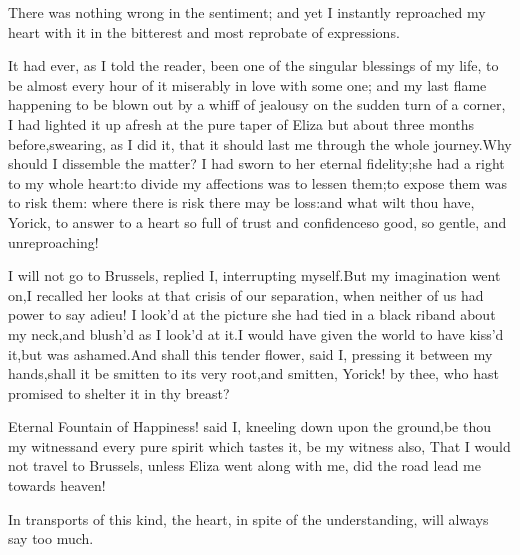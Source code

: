 \documentclass[twoside]{article}
\begin{document}
There was nothing wrong in the sentiment; and yet I instantly reproached
my heart with it in the bitterest and most reprobate of expressions.

It had ever, as I told the reader, been one of the singular blessings of
my life, to be almost every hour of it miserably in love with some one;
and my last flame happening to be blown out by a whiff of jealousy on the
sudden turn of a corner, I had lighted it up afresh at the pure taper of
Eliza but about three months before,\tsk swearing, as I did it, that it
should last me through the whole journey.\tsk Why should I dissemble the
matter?  I had sworn to her eternal fidelity;\tsk she had a right to my whole
heart:\tsk to divide my affections was to lessen them;\tsk to expose them was to
risk them: where there is risk there may be loss:\tsk and what wilt thou
have, Yorick, to answer to a heart so full of trust and confidence\tsk so
good, so gentle, and unreproaching!

\tsk I will not go to Brussels, replied I, interrupting myself.\tsk But my
imagination went on,\tsk I recalled her looks at that crisis of our
separation, when neither of us had power to say adieu!  I look’d at the
picture she had tied in a black riband about my neck,\tsk and blush’d as I
look’d at it.\tsk I would have given the world to have kiss’d it,\tsk but was
ashamed.\tsk And shall this tender flower, said I, pressing it between my
hands,\tsk shall it be smitten to its very root,\tsk and smitten, Yorick! by
thee, who hast promised to shelter it in thy breast?

Eternal Fountain of Happiness! said I, kneeling down upon the ground,\tsk be
thou my witness\tsk and every pure spirit which tastes it, be my witness
also, That I would not travel to Brussels, unless Eliza went along with
me, did the road lead me towards heaven!

In transports of this kind, the heart, in spite of the understanding,
will always say too much.




\end{document}
